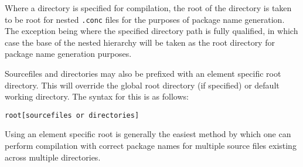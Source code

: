 \documentclass[conc-doc]{subfiles}
\begin{document}
Where a directory is specified for compilation, the root of the directory is taken to be root for nested \lstinline[language=None]{.conc} files for the purposes of package name generation. The exception being where the specified directory path is fully qualified, in which case the base of the nested hierarchy will be taken as the root directory for package name generation purposes.

Sourcefiles and directories may also be prefixed with an element specific root directory. This will override the global root directory (if specified) or default working directory. The syntax for this is as follows:

\begin{center}
	\lstinline[language=None]{root[sourcefiles or directories]}
\end{center}


Using an element specific root is generally the easiest method by which one can perform compilation with correct package names for multiple source files existing across multiple directories.
\end{document}
